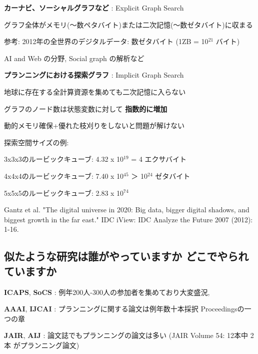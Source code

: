 \begin{container-fluid}
\begin{row-fluid}
\begin{span4}
\textbf{カーナビ、ソーシャルグラフなど} : Explicit Graph Search

グラフ全体がメモリ(〜数ペタバイト)または二次記憶(〜数ゼタバイト)に収まる

参考: 2012年の全世界のデジタルデータ: 数ゼタバイト (1ZB = 10\(^{\text{21}}\) バイト)

AI and Web の分野, Social graph の解析など
\end{span4}
\begin{span8}
\textbf{プランニングにおける探索グラフ} : Implicit Graph Search

地球に存在する全計算資源を集めても二次記憶に入らない

グラフのノード数は状態変数に対して \textbf{指数的に増加}

動的メモリ確保+優れた枝刈りをしないと問題が解けない

探索空間サイズの例:

3x3x3のルービックキューブ: 4.32 x 10\(^{\text{19}}\) = 4 エクサバイト

4x4x4のルービックキューブ: 7.40 x 10\(^{\text{45}}\) ＞ 10\(^{\text{24}}\) ゼタバイト

5x5x5のルービックキューブ: 2.83 x 10\(^{\text{74}}\)
\end{span8}
\end{row-fluid}
\end{container-fluid}

\begin{note}
Gantz et al. "The digital universe in 2020: Big data, bigger digital shadows, and biggest growth in the far east." IDC iView: IDC Analyze the Future 2007 (2012): 1-16.
\end{note}

\subsection{似たような研究は誰がやっていますか どこでやられていますか}
\label{sec:orgheadline61}

\textbf{ICAPS}, \textbf{SoCS} : 例年200人-300人の参加者を集めており大変盛況, 

\textbf{AAAI}, \textbf{IJCAI} : プランニングに関する論文は例年数十本採択 Proceedingsの一つの章

\textbf{JAIR}, \textbf{AIJ} : 論文誌でもプランニングの論文は多い (JAIR Volume 54: 12本中 2本 がプランニング論文)

